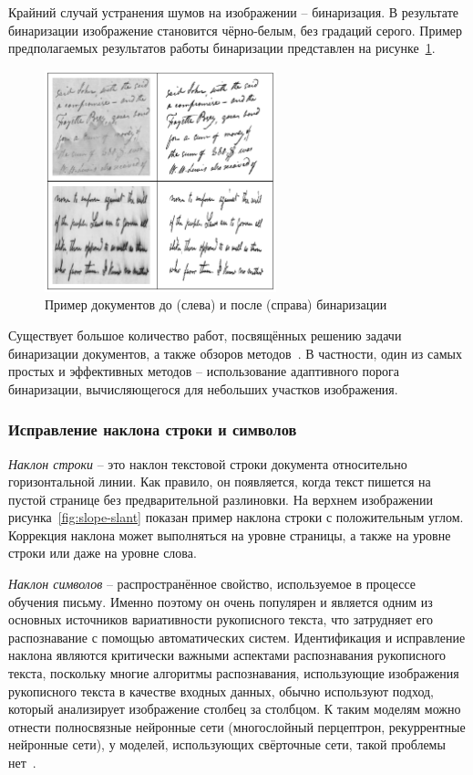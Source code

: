 Крайний случай устранения шумов на изображении -- бинаризация.
В результате бинаризации изображение становится чёрно-белым, без градаций серого.
Пример предполагаемых результатов работы бинаризации представлен на рисунке~\ref{fig:binarization}.
\begin{figure}[h!]
    \centering
    \includegraphics[width=0.6\textwidth]{img/binarization}
    \caption{Пример документов до (слева) и после (справа) бинаризации}
    \label{fig:binarization}
\end{figure}

Существует большое количество работ, посвящённых решению задачи бинаризации документов, а также обзоров методов~\cite{mustafa2018binarization}.
В частности, один из самых простых и эффективных методов -- использование адаптивного порога бинаризации, вычисляющегося для небольших участков изображения.


\subsubsection{Исправление наклона строки и символов}
\label{subsubsec:slope-slant-correction}

\textit{Наклон строки} -- это наклон текстовой строки документа относительно горизонтальной линии.
Как правило, он появляется, когда текст пишется на пустой странице без предварительной разлиновки.
На верхнем изображении рисунка~\ref{fig:slope-slant} показан пример наклона строки с положительным углом.
Коррекция наклона может выполняться на уровне страницы, а также на уровне строки или даже на уровне слова.

\textit{Наклон символов} -- распространённое свойство, используемое в процессе обучения письму.
Именно поэтому он очень популярен и является одним из основных источников вариативности рукописного текста,
что затрудняет его распознавание с помощью автоматических систем.
Идентификация и исправление наклона являются критически важными аспектами распознавания рукописного текста,
поскольку многие алгоритмы распознавания, использующие изображения рукописного текста в качестве входных данных,
обычно используют подход, который анализирует изображение столбец за столбцом.
К таким моделям можно отнести полносвязные нейронные сети (многослойный перцептрон, рекуррентные нейронные сети),
у моделей, использующих свёрточные сети, такой проблемы нет~\cite{sueiras2021continuous}.

